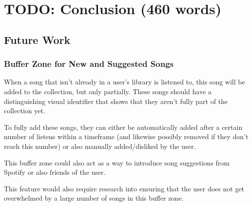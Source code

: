 \chapter{TODO: Conclusion (460 words)}%



\section{Future Work}
\subsection{Buffer Zone for New and Suggested Songs}
When a song that isn't already in a user's library is listened to, this song will be added to the collection, but only partially. These songs should have a distinguishing visual identifier that shows that they aren't fully part of the collection yet.

To fully add these songs, they can either be automatically added after a certain number of listens within a timeframe (and likewise possibly removed if they don't reach this number) or also manually added/disliked by the user.

This buffer zone could also act as a way to introduce song suggestions from Spotify or also friends of the user.

This feature would also require research into ensuring that the user does not get overwhelmed by a large number of songs in this buffer zone.

